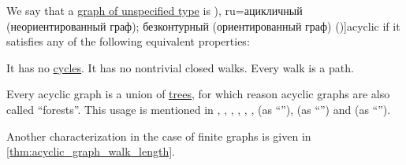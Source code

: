 \begin{definition}\label{def:acyclic_graph}
  We say that a \hyperref[rem:graph_of_unspecified_type]{graph of unspecified type} is \term[bg=ацикличен (ориентиран граф) (\cite[14]{Мирчев2001Графи}), ru=ацикличный (неориентированный граф); безконтурный (ориентированный граф) (\cite[280]{БелоусовТкачёв2004ДискретнаяМатематика})]{acyclic} if it satisfies any of the following equivalent properties:
  \begin{thmenum}
     It has no \hyperref[def:graph_cycle]{cycles}.
     It has no nontrivial closed walks.
     Every walk is a path.
  \end{thmenum}
\end{definition}
\begin{comments}
  \item Every acyclic graph is a union of \hyperref[def:tree]{trees}, for which reason acyclic graphs are also called \enquote{forests}. This usage is mentioned in
  \cite[13]{Diestel2017GraphTheory},
  \cite[32]{Harary1969GraphTheory},
  \cite[21]{Bollobás1998ModernGraphTheory},
  \cite[def. 1.3.5.]{Knauer2019AlgebraicGraphTheory},
  \cite[782]{Rosen2019DiscreteMathematics},
  \cite[191]{Erickson2019Algorithms},
  \cite[53]{ЕмеличевИПр1990ТеорияГрафов} (as \enquote{}),
  \cite[\S 9.1.1]{Новиков2013ДискретнаяМатематика} (as \enquote{}) and
  \cite[21]{Мирчев2001Графи} (as \enquote{}).

  \item Another characterization in the case of finite graphs is given in \cref{thm:acyclic_graph_walk_length}.
\end{comments}

